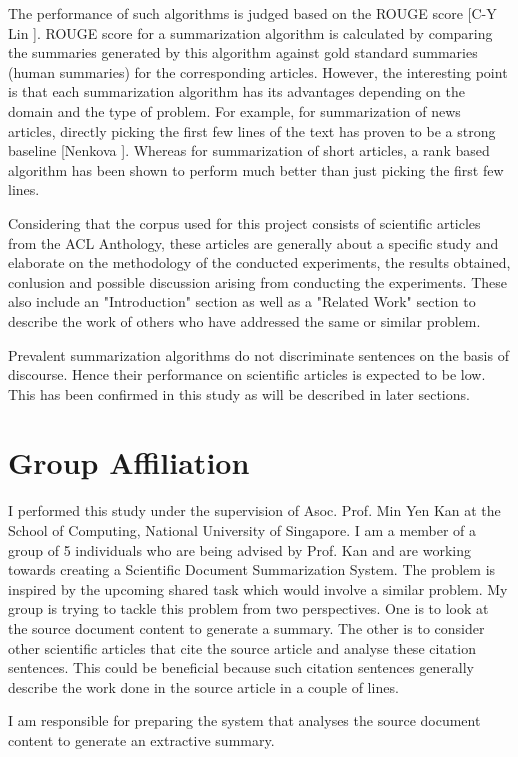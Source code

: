 The performance of such algorithms is judged based on the ROUGE score [C-Y Lin \cite{Lin2004}].
ROUGE score for a summarization algorithm is calculated by comparing the summaries generated by this algorithm against gold standard summaries (human summaries) for the corresponding articles.
However, the interesting point is that each summarization algorithm has its advantages depending on the domain and the type of problem.
For example, for summarization of news articles, directly picking the first few lines of the text has proven to be a strong baseline [Nenkova \cite{DBLP:conf/aaai/Nenkova05}].
Whereas for summarization of short articles, a rank based algorithm has been shown to perform much better than just picking the first few lines.

Considering that the corpus used for this project consists of scientific articles from the ACL Anthology, these articles are generally about a specific study and elaborate on the methodology of the conducted experiments, the results obtained, conlusion and possible discussion arising from conducting the experiments.
These also include an "Introduction" section as well as a "Related Work" section to describe the work of others who have addressed the same or similar problem.

Prevalent summarization algorithms do not discriminate sentences on the basis of discourse.
Hence their performance on scientific articles is expected to be low.
This has been confirmed in this study as will be described in later sections.

\section{Group Affiliation}
I performed this study under the supervision of Asoc. Prof. Min Yen Kan at the School of Computing, National University of Singapore.
I am a member of a group of 5 individuals who are being advised by Prof. Kan and are working towards creating a Scientific Document Summarization System.
The problem is inspired by the upcoming shared task which would involve a similar problem.
My group is trying to tackle this problem from two perspectives.
One is to look at the source document content to generate a summary.
The other is to consider other scientific articles that cite the source article and analyse these citation sentences.
This could be beneficial because such citation sentences generally describe the work done in the source article in a couple of lines.

I am responsible for preparing the system that analyses the source document content to generate an extractive summary.